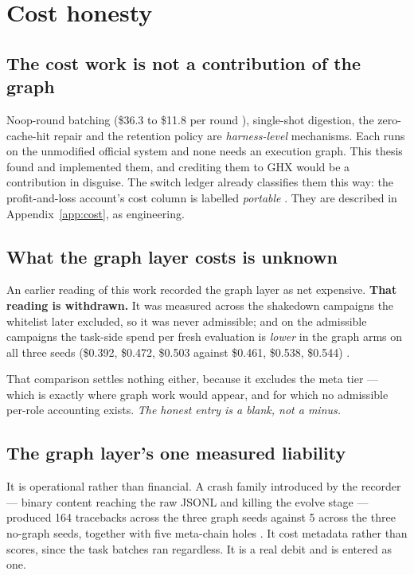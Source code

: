 \section{Cost honesty}
\label{sec:cost}

\subsection*{The cost work is not a contribution of the graph}

Noop-round batching (\$36.3 to \$11.8 per round ), single-shot
digestion, the zero-cache-hit repair and the retention policy are
\emph{harness-level} mechanisms. Each runs on the unmodified official
system and none needs an execution graph. This thesis found and implemented
them, and crediting them to GHX would be a contribution in disguise. The
switch ledger already classifies them this way: the profit-and-loss
account's cost column is labelled \emph{portable} . They are
described in Appendix~\ref{app:cost}, as engineering.

\subsection*{What the graph layer costs is unknown}

An earlier reading of this work recorded the graph layer as net expensive.
\textbf{That reading is withdrawn.} It was measured across the shakedown
campaigns the whitelist later excluded, so it was never admissible; and on
the admissible campaigns the task-side spend per fresh evaluation is
\emph{lower} in the graph arms on all three seeds (\$0.392, \$0.472,
\$0.503 against \$0.461, \$0.538, \$0.544) .

That comparison settles nothing either, because it excludes the meta tier
--- which is exactly where graph work would appear, and for which no
admissible per-role accounting exists. \emph{The honest entry is a blank,
not a minus.}

\subsection*{The graph layer's one measured liability}

It is operational rather than financial. A crash family introduced by the
recorder --- binary content reaching the raw JSONL and killing the evolve
stage --- produced 164 tracebacks across the three graph seeds against 5
across the three no-graph seeds, together with five meta-chain holes . It
cost metadata rather than scores, since the task batches ran regardless.
It is a real debit and is entered as one.

